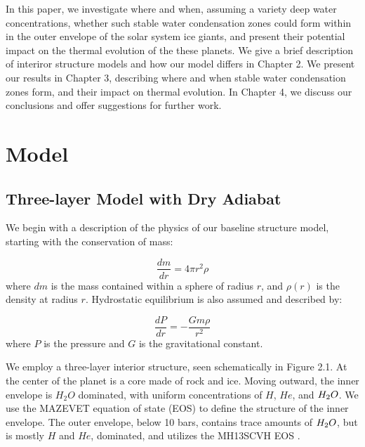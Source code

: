 \documentclass[11pt]{ucscthesisbs}
\begin{document}
In this paper, we investigate where and when, assuming a variety deep water concentrations, whether such stable water condensation zones could form within in the outer envelope of the solar system ice giants, and present their potential impact on the thermal evolution of the these planets. We give a brief description of interiror structure models and how our model differs in Chapter 2. We present our results in Chapter 3, describing where and when stable water condensation zones form, and their impact on thermal evolution. In Chapter 4, we discuss our conclusions and offer suggestions for further work.


\chapter{Model}

\section{Three-layer Model with Dry Adiabat}
We begin with a description of the physics of our baseline structure model, starting with the conservation of mass:

\begin{equation}
  \frac{dm}{dr} =4 \pi r^{2}\rho  
\end{equation}
where $dm$ is the mass contained within a sphere of radius $r$, and $\rho(r)$ is the density at radius $r$. Hydrostatic equilibrium is also assumed and described by:

\begin{equation}
  \frac{dP}{dr} = -\frac{Gm\rho}{r^{2}}  
\end{equation}
where $P$ is the pressure and $G$ is the gravitational constant. 

We employ a three-layer interior structure, seen schematically in Figure 2.1. At the center of the planet is a core made of rock and ice. Moving outward, the inner envelope is $H_{2}O$ dominated, with uniform concentrations of $H$, $He$, and $H_{\rm{2}}O$. We use the MAZEVET equation of state (EOS) \citep{mazevet_2019} to define the structure of the inner envelope. The outer envelope, below 10 bars, contains trace amounts of $H_{\rm{2}}O$, but is mostly $H$ and $He$, dominated, and utilizes the MH13SCVH EOS \citep{miguel_2018}. 
\end{document}
